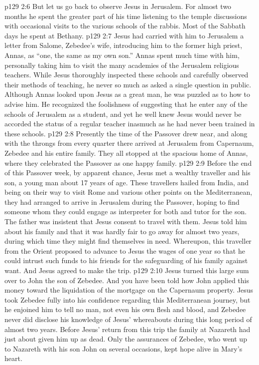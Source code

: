 \vs p129 2:6 \pc But let us go back to observe Jesus in Jerusalem. For almost two months he spent the greater part of his time listening to the temple discussions with occasional visits to the various schools of the rabbis. Most of the Sabbath days he spent at Bethany.
\vs p129 2:7 Jesus had carried with him to Jerusalem a letter from Salome, Zebedee’s wife, introducing him to the former high priest, Annas, as “one, the same as my own son.” Annas spent much time with him, personally taking him to visit the many academies of the Jerusalem religious teachers. While Jesus thoroughly inspected these schools and carefully observed their methods of teaching, he never so much as asked a single question in public. Although Annas looked upon Jesus as a great man, he was puzzled as to how to advise him. He recognized the foolishness of suggesting that he enter any of the schools of Jerusalem as a student, and yet he well knew Jesus would never be accorded the status of a regular teacher inasmuch as he had never been trained in these schools.
\vs p129 2:8 Presently the time of the Passover drew near, and along with the throngs from every quarter there arrived at Jerusalem from Capernaum, Zebedee and his entire family. They all stopped at the spacious home of Annas, where they celebrated the Passover as one happy family.
\vs p129 2:9 \pc Before the end of this Passover week, by apparent chance, Jesus met a wealthy traveller and his son, a young man about 17 years of age. These travellers hailed from India, and being on their way to visit Rome and various other points on the Mediterranean, they had arranged to arrive in Jerusalem during the Passover, hoping to find someone whom they could engage as interpreter for both and tutor for the son. The father was insistent that Jesus consent to travel with them. Jesus told him about his family and that it was hardly fair to go away for almost two years, during which time they might find themselves in need. Whereupon, this traveller from the Orient proposed to advance to Jesus the wages of one year so that he could intrust such funds to his friends for the safeguarding of his family against want. And Jesus agreed to make the trip.
\vs p129 2:10 Jesus turned this large sum over to John the son of Zebedee. And you have been told how John applied this money toward the liquidation of the mortgage on the Capernaum property. Jesus took Zebedee fully into his confidence regarding this Mediterranean journey, but he enjoined him to tell no man, not even his own flesh and blood, and Zebedee never did disclose his knowledge of Jesus’ whereabouts during this long period of almost two years. Before Jesus’ return from this trip the family at Nazareth had just about given him up as dead. Only the assurances of Zebedee, who went up to Nazareth with his son John on several occasions, kept hope alive in Mary’s heart.
